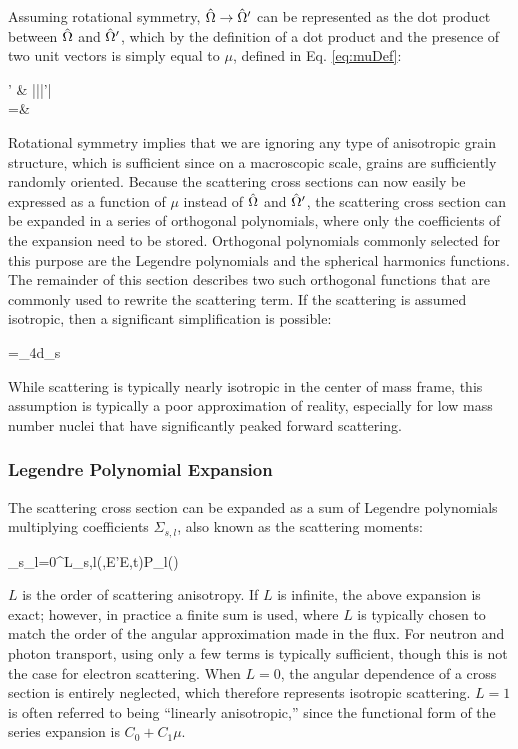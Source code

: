 Assuming rotational symmetry, \(\hat{\Omega}\rightarrow\hat{\Omega}'\) can be represented as the dot product between \(\hat{\Omega}\) and \(\hat{\Omega}'\), which by the definition of a dot product and the presence of two unit vectors is simply equal to \(\mu\), defined in Eq. \eqref{eq:muDef}:

\beqa
\label{eq:OmegaDotOmega}
\hO  \cdot\hO  ' \equiv& |\hO  ||\hO  '| \cos{(\theta)} \\
=&\ \mu
\eeqa

Rotational symmetry implies that we are ignoring any type of anisotropic grain structure, which is sufficient since on a macroscopic scale, grains are sufficiently randomly oriented. Because the scattering cross sections can now easily be expressed as a function of \(\mu\) instead of \(\hat{\Omega}\) and \(\hat{\Omega}'\), the scattering cross section can be expanded in a series of orthogonal polynomials, where only the coefficients of the expansion need to be stored. Orthogonal polynomials commonly selected for this purpose are the Legendre polynomials and the spherical harmonics functions. The remainder of this section describes two such orthogonal functions that are commonly used to rewrite the scattering term. If the scattering is assumed isotropic, then a significant simplification is possible:

\beq
{}=\int_{4\pi}d\hO\Sigma_s\seatout
\eeq

While scattering is typically nearly isotropic in the center of mass frame, this assumption is typically a poor approximation of reality, especially for low mass number nuclei that have significantly peaked forward scattering.

\subsubsection{Legendre Polynomial Expansion}
\label{sec:LegendrePolynomialExpansion}

The scattering cross section can be expanded as a sum of Legendre polynomials multiplying coefficients \(\Sigma_{s,l}\), also known as the scattering moments:

\beq
\label{eq:ScatteringLegendre}
\Sigma_s\seatout \equiv\sum_{l=0}^L\Sigma_{s,l}(,E'\rightarrow E,t)P_l(\mu)
\eeq

\(L\) is the order of scattering anisotropy. If \(L\) is infinite, the above expansion is exact; however, in practice a finite sum is used, where \(L\) is typically chosen to match the order of the angular approximation made in the flux. For neutron and photon transport, using only a few terms is typically sufficient, though this is not the case for electron scattering. When \(L=0\), the angular dependence of a cross section is entirely neglected, which therefore represents isotropic scattering. \(L=1\) is often referred to being ``linearly anisotropic,'' since the functional form of the series expansion is \(C_0+C_1\mu\).

